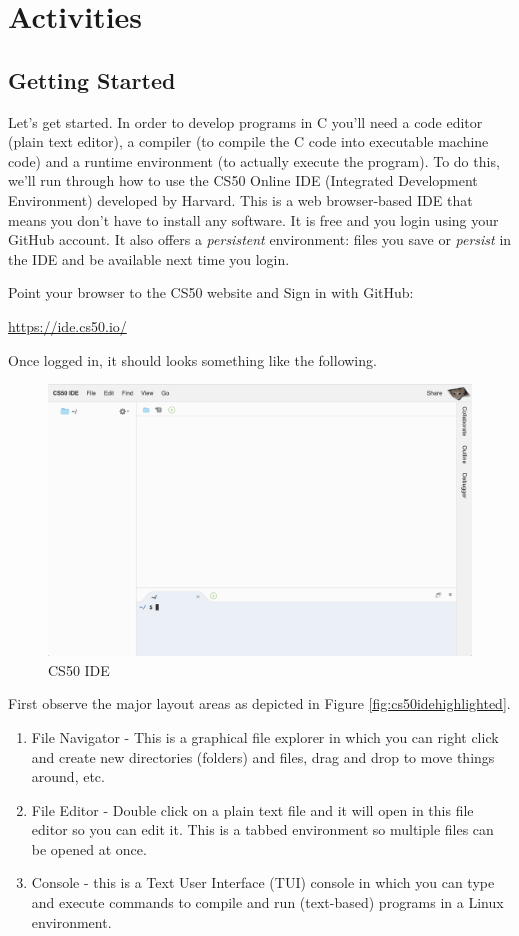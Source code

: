 \documentclass[12pt]{scrartcl}
\begin{document}
\section{Activities}

\subsection{Getting Started}

Let's get started.  In order to develop programs in C you'll need
a code editor (plain text editor), a compiler (to compile the C code
into executable machine code) and a runtime environment (to actually
execute the program).  To do this, we'll run through how to use the 
CS50 Online IDE (Integrated Development Environment) developed by 
Harvard.  This is a web browser-based IDE that means you don't have
to install any software.  It is free and you login using your GitHub
account.  It also offers a \emph{persistent} environment: files you 
save or \emph{persist} in the IDE and be available next time you login.

Point your browser to the CS50 website and Sign in with GitHub:

\url{https://ide.cs50.io/}

Once logged in, it should looks something like the following.

\begin{figure}[h]
\centering
\includegraphics[scale=0.35]{img/cs50-clean}
\caption{CS50 IDE}
\end{figure}

First observe the major layout areas as depicted in Figure \ref{fig:cs50idehighlighted}.

\begin{enumerate}
  \item File Navigator - This is a graphical file explorer in which you can right click and create new directories (folders) and files, drag and drop to move things around, etc.
  \item File Editor - Double click on a plain text file and it will open in this file editor so you can edit it.  This is a tabbed environment so multiple files can be opened at once.
  \item Console - this is a Text User Interface (TUI) console in which you can type and execute commands to compile and run (text-based) programs in a Linux environment.
\end{enumerate}
\end{document}
